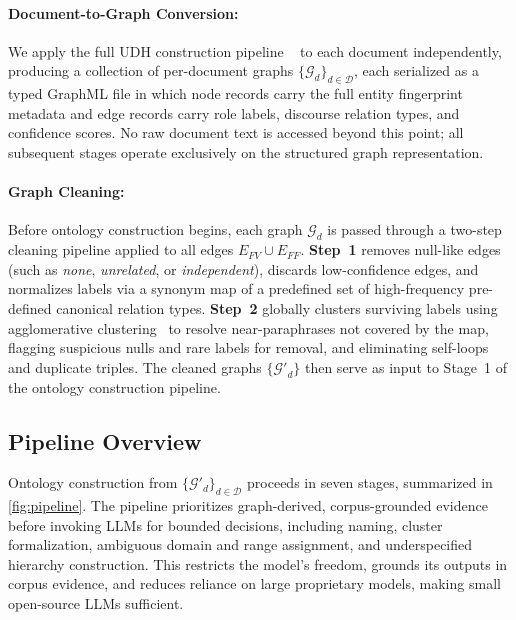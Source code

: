 \documentclass[sigconf]{acmart}
\begin{document}
\paragraph{\textbf{Document-to-Graph Conversion:}} We apply the full UDH construction pipeline ~\cite{udh2026} to each document independently, producing a collection of per-document graphs $\{\mathcal{G}_d\}_{d \in \mathcal{D}}$, each serialized as a typed GraphML file in which node records carry the full entity fingerprint metadata and edge records carry role labels, discourse relation types, and confidence scores. No raw document text is accessed beyond this point; all subsequent stages operate exclusively on the structured graph representation.

\paragraph{\textbf{Graph Cleaning:}}
Before ontology construction begins, each graph $\mathcal{G}_d$ is passed through a two-step cleaning pipeline applied to all edges $E_{FV} \cup E_{FF}$. 
\textbf{Step~1} removes null-like edges (such as \textit{none}, \textit{unrelated}, or \textit{independent}), discards low-confidence edges, and normalizes labels via a synonym map of a predefined set of high-frequency pre-defined canonical relation types. \textbf{Step~2} globally clusters surviving labels using agglomerative clustering~\cite{mullner2011modern} to resolve near-paraphrases not covered by the map, flagging suspicious nulls and rare labels for removal, and eliminating self-loops and duplicate triples.
The cleaned graphs  $\{\mathcal{G'}_d\}$ then serve as input to Stage~1 of the ontology construction pipeline.

\vspace{-2pt}
\subsection{Pipeline Overview}
\label{subsec:overview}
Ontology construction from $\{\mathcal{G}'_d\}_{d \in \mathcal{D}}$ proceeds in seven stages, summarized in \autoref{fig:pipeline}. The pipeline prioritizes graph-derived, corpus-grounded evidence before invoking LLMs for bounded decisions, including naming, cluster formalization, ambiguous domain and range assignment, and underspecified hierarchy construction. This restricts the model's freedom, grounds its outputs in corpus evidence, and reduces reliance on large proprietary models, making small open-source LLMs sufficient.
\end{document}
